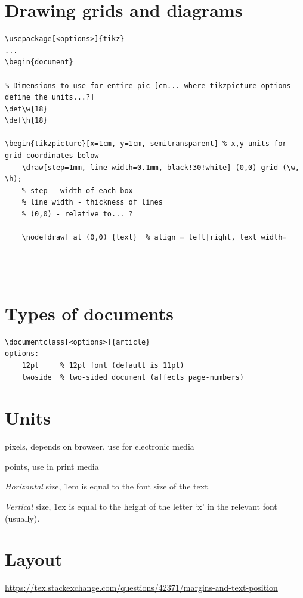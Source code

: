 \documentclass{article}
\begin{document}
\section{Drawing grids and diagrams}
\begin{lstlisting}
\usepackage[<options>]{tikz}
...
\begin{document}

% Dimensions to use for entire pic [cm... where tikzpicture options define the units...?]
\def\w{18}
\def\h{18}

\begin{tikzpicture}[x=1cm, y=1cm, semitransparent] % x,y units for grid coordinates below
    \draw[step=1mm, line width=0.1mm, black!30!white] (0,0) grid (\w, \h);
    % step - width of each box
    % line width - thickness of lines
    % (0,0) - relative to... ?

    \node[draw] at (0,0) {text}  % align = left|right, text width=




\end{lstlisting}

\section{Types of documents}
\begin{lstlisting}
\documentclass[<options>]{article}
options:
    12pt     % 12pt font (default is 11pt)
    twoside  % two-sided document (affects page-numbers)
\end{lstlisting}

\section{Units}
\begin{description}[itemsep=-1ex]
    \item [px] pixels, depends on browser, use for electronic media
    \item [pt] points, use in print media
    \item [em] \emph{Horizontal} size, 1em is equal to the font size of
        the text.
    \item [ex] \emph{Vertical} size, 1ex is equal to the height of the
        letter `x' in the relevant font (usually).
\end{description}

\section{Layout}
\url{https://tex.stackexchange.com/questions/42371/margins-and-text-position}
\end{document}
